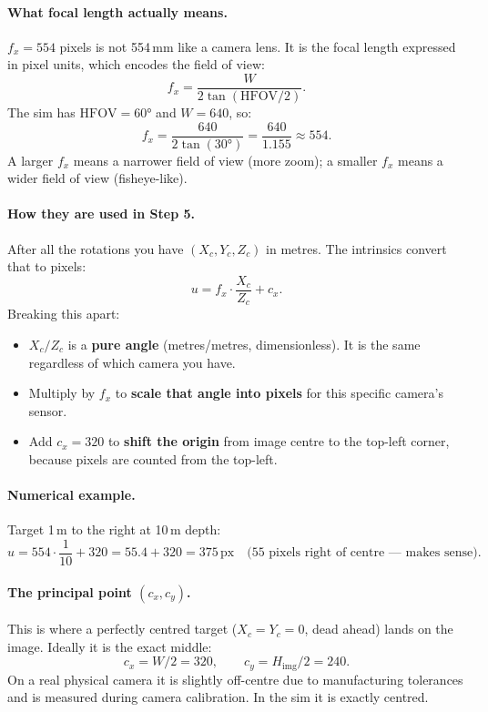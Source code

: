 \documentclass[11pt]{article}
\begin{document}
\paragraph{What focal length actually means.}
$f_x = 554$ pixels is not 554\,mm like a camera lens. It is the focal length
expressed in pixel units, which encodes the field of view:
\[
f_x = \frac{W}{2\tan(\mathrm{HFOV}/2)}.
\]
The sim has $\mathrm{HFOV}=60°$ and $W=640$, so:
\[
f_x = \frac{640}{2\tan(30°)} = \frac{640}{1.155} \approx 554.
\]
A larger $f_x$ means a narrower field of view (more zoom); a smaller $f_x$ means
a wider field of view (fisheye-like).

\paragraph{How they are used in Step 5.}
After all the rotations you have $(X_c, Y_c, Z_c)$ in metres. The intrinsics
convert that to pixels:
\[
u = f_x \cdot \frac{X_c}{Z_c} + c_x.
\]
Breaking this apart:
\begin{itemize}
    \item $X_c / Z_c$ is a \textbf{pure angle} (metres/metres, dimensionless).
          It is the same regardless of which camera you have.
    \item Multiply by $f_x$ to \textbf{scale that angle into pixels} for this
          specific camera's sensor.
    \item Add $c_x = 320$ to \textbf{shift the origin} from image centre to the
          top-left corner, because pixels are counted from the top-left.
\end{itemize}

\paragraph{Numerical example.}
Target 1\,m to the right at 10\,m depth:
\[
u = 554 \cdot \frac{1}{10} + 320 = 55.4 + 320 = 375\,\text{px} \quad
\text{(55 pixels right of centre --- makes sense)}.
\]

\paragraph{The principal point $(c_x, c_y)$.}
This is where a perfectly centred target ($X_c = Y_c = 0$, dead ahead) lands on
the image. Ideally it is the exact middle:
\[
c_x = W/2 = 320, \qquad c_y = H_\text{img}/2 = 240.
\]
On a real physical camera it is slightly off-centre due to manufacturing
tolerances and is measured during camera calibration. In the sim it is exactly
centred.
\end{document}
